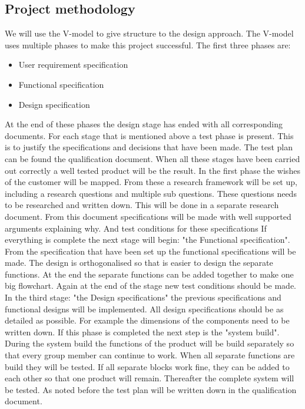 \documentclass[10pt,a4paper]{article}
\begin{document}
\subsection{Project methodology}
We will use the V-model to give structure to the design approach. The V-model uses multiple phases to make this project successful. The first three phases are: 
\begin{itemize}
\item User requirement specification
\item Functional specification
\item Design specification
\end{itemize}
At the end of these phases the design stage has ended with all corresponding documents. For each stage that is mentioned above a test phase is present. This is to justify the specifications and decisions that have been made. The test plan can be found the qualification document. When all these stages have been carried out correctly a well tested product will be the result. In the first phase the wishes of the customer will be mapped. From these a research framework will be set up, including a research questions and multiple sub questions. These questions needs to be researched and written down. This will be done in a separate research document. From this document specifications will be made with well supported arguments explaining why. And test conditions for these specifications If everything is complete the next stage will begin: "the Functional specification". From the specification that have been set up the functional specifications will be made. The design is orthogonalised so that is easier to design the separate functions. At the end the separate functions can be added together to make one big flowchart. Again at the end of the stage new test conditions should be made. In the third stage: "the Design specifications" the previous specifications and functional designs will be implemented. All design specifications should be as detailed as possible. For example the dimensions of the components need to be written down. If this phase is completed the next step is the "system build". During the system build the  functions of the product will be build separately so that every group member can continue to work. When all separate functions are build they will be tested. If all separate blocks work fine, they can be added to each other so that one product will remain. Thereafter the complete system will be tested. As noted before the test plan will be written down in the qualification document. 
\end{document}
